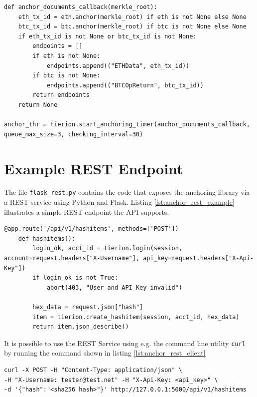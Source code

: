 \documentclass[12pt,msc,a4paper,oneside]{ucl_thesis}
\begin{document}
\begin{Code}
\begin{lstlisting}[style=myPython, caption=Wiring up integration with service, label=lst:anchor_wiring_up]
def anchor_documents_callback(merkle_root):
    eth_tx_id = eth.anchor(merkle_root) if eth is not None else None
    btc_tx_id = btc.anchor(merkle_root) if btc is not None else None
    if eth_tx_id is not None or btc_tx_id is not None:
        endpoints = []
        if eth is not None:
            endpoints.append(("ETHData", eth_tx_id))
        if btc is not None:
            endpoints.append(("BTCOpReturn", btc_tx_id))
        return endpoints
    return None

anchor_thr = tierion.start_anchoring_timer(anchor_documents_callback, queue_max_size=3, checking_interval=30)
\end{lstlisting}
\end{Code}

\section{Example REST Endpoint}
The file \texttt{flask\_rest.py} contains the code that exposes the anchoring library via a REST service using Python and Flask. Listing \ref{lst:anchor_rest_example} illustrates a simple REST endpoint the API supports. 
\begin{Code}
\begin{lstlisting}[style=myPython, caption=Example REST Endpoint - HashItem, label=lst:anchor_rest_example]
 @app.route('/api/v1/hashitems', methods=['POST'])
    def hashitems():
        login_ok, acct_id = tierion.login(session, account=request.headers["X-Username"], api_key=request.headers["X-Api-Key"])
        if login_ok is not True:
            abort(403, "User and API Key invalid")

        hex_data = request.json["hash"]
        item = tierion.create_hashitem(session, acct_id, hex_data)
        return item.json_describe()
\end{lstlisting}
\end{Code}
\noindent It is possible to use the REST Service using e.g. the command line utility \texttt{curl} by running the command shown in listing \ref{lst:anchor_rest_client}
\begin{Code}
\begin{lstlisting}[style=myBash, caption=Example REST Endpoint - client, label=lst:anchor_rest_client]
curl -X POST -H "Content-Type: application/json" \ 
-H "X-Username: tester@test.net" -H "X-Api-Key: <api_key>" \ 
-d '{"hash":"<sha256 hash>"}' http://127.0.0.1:5000/api/v1/hashitems
\end{lstlisting}
\end{Code}
\end{document}
